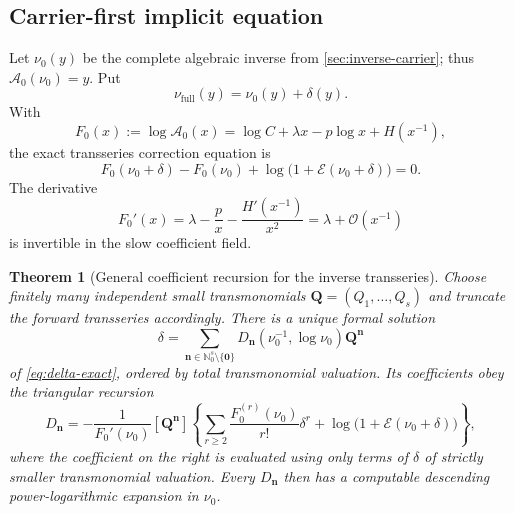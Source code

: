 \documentclass[11pt,oneside]{article}
\numberwithin{equation}{section}
\theoremstyle{plain}
\newtheorem{theorem}{Theorem}[section]
\theoremstyle{definition}
\theoremstyle{remark}
\newcommand{\Ord}{\mathcal O}
\newcommand{\Nzero}{\mathbb N_0}
\begin{document}
\subsection{Carrier-first implicit equation}

Let $\nu_0(y)$ be the complete algebraic inverse from
\cref{sec:inverse-carrier}; thus $\mathcal A_0(\nu_0)=y$.  Put
\begin{equation}\label{eq:delta-exp-def}
 \nu_{\mathrm{full}}(y)=\nu_0(y)+\delta(y).
\end{equation}
With
\begin{equation}\label{eq:F0-def}
 F_0(x):=\log\mathcal A_0(x)
 =\log C+\lambda x-p\log x+H(x^{-1}),
\end{equation}
the exact transseries correction equation is
\begin{equation}\label{eq:delta-exact}
 \boxed{
 F_0(\nu_0+\delta)-F_0(\nu_0)
 +\log\bigl(1+\mathcal E(\nu_0+\delta)\bigr)=0.}
\end{equation}
The derivative
\begin{equation}\label{eq:F0-prime}
 F_0'(x)=\lambda-\frac px-\frac{H'(x^{-1})}{x^2}
 =\lambda+\Ord(x^{-1})
\end{equation}
is invertible in the slow coefficient field.

\begin{theorem}[General coefficient recursion for the inverse transseries]
\label{thm:inverse-exponential-recursion}
Choose finitely many independent small transmonomials
$\bm Q=(Q_1,\ldots,Q_s)$ and truncate the forward transseries accordingly.
There is a unique formal solution
\begin{equation}\label{eq:delta-multi}
 \delta=\sum_{\bm n\in\Nzero^s\setminus\{\bm0\}}
 D_{\bm n}(\nu_0^{-1},\log\nu_0)\bm Q^{\bm n}
\end{equation}
of \eqref{eq:delta-exact}, ordered by total transmonomial valuation.  Its
coefficients obey the triangular recursion
\begin{equation}\label{eq:Dmulti-recursion}
 \boxed{
 D_{\bm n}=-\frac1{F_0'(\nu_0)}
 [\bm Q^{\bm n}]
 \left\{
 \sum_{r\ge2}\frac{F_0^{(r)}(\nu_0)}{r!}\delta^r
 +\log\bigl(1+\mathcal E(\nu_0+\delta)\bigr)
 \right\},}
\end{equation}
where the coefficient on the right is evaluated using only terms of
$\delta$ of strictly smaller transmonomial valuation.  Every
$D_{\bm n}$ then has a computable descending power-logarithmic expansion in
$\nu_0$.
\end{theorem}
\end{document}

